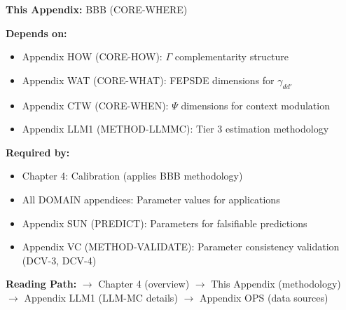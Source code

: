 \begin{tcolorbox}[colback=gray!10!white, colframe=gray!75!black,
    title=\textbf{Cross-Reference Footer}]

\textbf{This Appendix:} BBB (CORE-WHERE)

\textbf{Depends on:}
\begin{itemize}[nosep]
    \item Appendix HOW (CORE-HOW): $\Gamma$ complementarity structure
    \item Appendix WAT (CORE-WHAT): FEPSDE dimensions for $\gamma_{dd'}$
    \item Appendix CTW (CORE-WHEN): $\Psi$ dimensions for context modulation
    \item Appendix LLM1 (METHOD-LLMMC): Tier 3 estimation methodology
\end{itemize}

\textbf{Required by:}
\begin{itemize}[nosep]
    \item Chapter 4: Calibration (applies BBB methodology)
    \item All DOMAIN appendices: Parameter values for applications
    \item Appendix SUN (PREDICT): Parameters for falsifiable predictions
    \item Appendix VC (METHOD-VALIDATE): Parameter consistency validation (DCV-3, DCV-4)
\end{itemize}

\textbf{Reading Path:}
$\rightarrow$ Chapter 4 (overview) $\rightarrow$ This Appendix (methodology)
$\rightarrow$ Appendix LLM1 (LLM-MC details) $\rightarrow$ Appendix OPS (data sources)

\end{tcolorbox}

